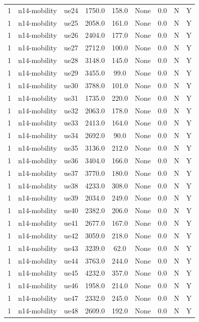 \begin{table}[ht]
\begin{tabular}{|c|c|c|c|c|c|c|c|c|}
1 & n14-mobility & ue24 & 1750.0 & 158.0 & None & 0.0 & N & Y \\
1 & n14-mobility & ue25 & 2058.0 & 161.0 & None & 0.0 & N & Y \\
1 & n14-mobility & ue26 & 2404.0 & 177.0 & None & 0.0 & N & Y \\
1 & n14-mobility & ue27 & 2712.0 & 100.0 & None & 0.0 & N & Y \\
1 & n14-mobility & ue28 & 3148.0 & 145.0 & None & 0.0 & N & Y \\
1 & n14-mobility & ue29 & 3455.0 & 99.0 & None & 0.0 & N & Y \\
1 & n14-mobility & ue30 & 3788.0 & 101.0 & None & 0.0 & N & Y \\
1 & n14-mobility & ue31 & 1735.0 & 220.0 & None & 0.0 & N & Y \\
1 & n14-mobility & ue32 & 2063.0 & 178.0 & None & 0.0 & N & Y \\
1 & n14-mobility & ue33 & 2413.0 & 164.0 & None & 0.0 & N & Y \\
1 & n14-mobility & ue34 & 2692.0 & 90.0 & None & 0.0 & N & Y \\
1 & n14-mobility & ue35 & 3136.0 & 212.0 & None & 0.0 & N & Y \\
1 & n14-mobility & ue36 & 3404.0 & 166.0 & None & 0.0 & N & Y \\
1 & n14-mobility & ue37 & 3770.0 & 180.0 & None & 0.0 & N & Y \\
1 & n14-mobility & ue38 & 4233.0 & 308.0 & None & 0.0 & N & Y \\
1 & n14-mobility & ue39 & 2034.0 & 249.0 & None & 0.0 & N & Y \\
1 & n14-mobility & ue40 & 2382.0 & 206.0 & None & 0.0 & N & Y \\
1 & n14-mobility & ue41 & 2677.0 & 167.0 & None & 0.0 & N & Y \\
1 & n14-mobility & ue42 & 3059.0 & 218.0 & None & 0.0 & N & Y \\
1 & n14-mobility & ue43 & 3239.0 & 62.0 & None & 0.0 & N & Y \\
1 & n14-mobility & ue44 & 3763.0 & 244.0 & None & 0.0 & N & Y \\
1 & n14-mobility & ue45 & 4232.0 & 357.0 & None & 0.0 & N & Y \\
1 & n14-mobility & ue46 & 1958.0 & 214.0 & None & 0.0 & N & Y \\
1 & n14-mobility & ue47 & 2332.0 & 245.0 & None & 0.0 & N & Y \\
1 & n14-mobility & ue48 & 2609.0 & 192.0 & None & 0.0 & N & Y \\

\end{tabular}
\end{table}
